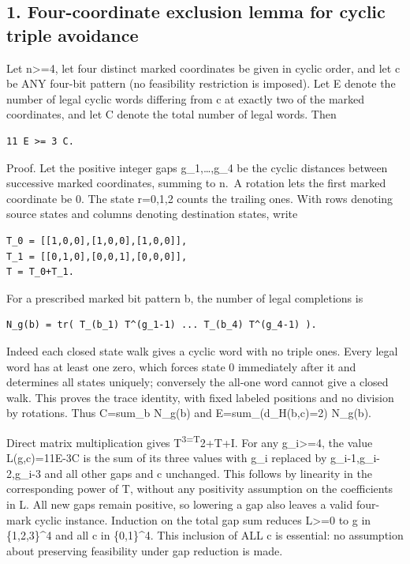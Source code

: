 \documentclass[
  10pt,
]{article}
\begin{document}
\subsection{1. Four-coordinate exclusion lemma for cyclic triple
avoidance}\label{four-coordinate-exclusion-lemma-for-cyclic-triple-avoidance}

Let n\textgreater=4, let four distinct marked coordinates be given in
cyclic order, and let c be ANY four-bit pattern (no feasibility
restriction is imposed). Let E denote the number of legal cyclic words
differing from c at exactly two of the marked coordinates, and let C
denote the total number of legal words. Then

\begin{verbatim}
11 E >= 3 C.
\end{verbatim}

Proof. Let the positive integer gaps g\_1,\ldots,g\_4 be the cyclic
distances between successive marked coordinates, summing to n.~A
rotation lets the first marked coordinate be 0. The state r=0,1,2 counts
the trailing ones. With rows denoting source states and columns denoting
destination states, write

\begin{verbatim}
T_0 = [[1,0,0],[1,0,0],[1,0,0]],
T_1 = [[0,1,0],[0,0,1],[0,0,0]],
T = T_0+T_1.
\end{verbatim}

For a prescribed marked bit pattern b, the number of legal completions
is

\begin{verbatim}
N_g(b) = tr( T_(b_1) T^(g_1-1) ... T_(b_4) T^(g_4-1) ).
\end{verbatim}

Indeed each closed state walk gives a cyclic word with no triple ones.
Every legal word has at least one zero, which forces state 0 immediately
after it and determines all states uniquely; conversely the all-one word
cannot give a closed walk. This proves the trace identity, with fixed
labeled positions and no division by rotations. Thus C=sum\_b N\_g(b)
and E=sum\_(d\_H(b,c)=2) N\_g(b).

Direct matrix multiplication gives T\textsuperscript{3=T}2+T+I. For any
g\_i\textgreater=4, the value L(g,c)=11E-3C is the sum of its three
values with g\_i replaced by g\_i-1,g\_i-2,g\_i-3 and all other gaps and
c unchanged. This follows by linearity in the corresponding power of T,
without any positivity assumption on the coefficients in L. All new gaps
remain positive, so lowering a gap also leaves a valid four-mark cyclic
instance. Induction on the total gap sum reduces L\textgreater=0 to g in
\{1,2,3\}\^{}4 and all c in \{0,1\}\^{}4. This inclusion of ALL c is
essential: no assumption about preserving feasibility under gap
reduction is made.
\end{document}

